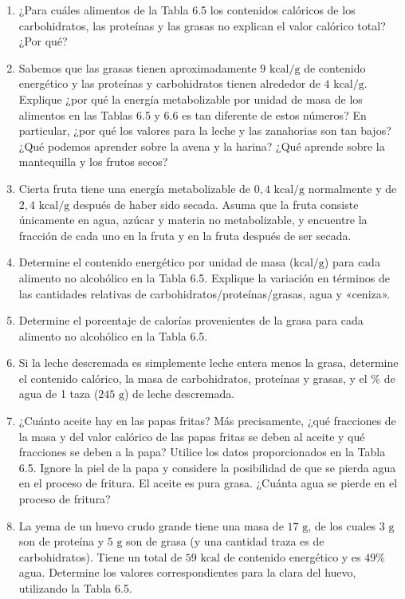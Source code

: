 \documentclass[12pt]{book}
\begin{document}
\begin{enumerate}
\item[6.17] ¿Para cuáles alimentos de la Tabla 6.5 los contenidos calóricos de los carbohidratos, las proteínas y las grasas no explican el valor calórico total? ¿Por qué?

\item[6.18] Sabemos que las grasas tienen aproximadamente $9\text{ kcal/g}$ de contenido energético y las proteínas y carbohidratos tienen alrededor de $4\text{ kcal/g}$. Explique ¿por qué la energía metabolizable por unidad de masa de los alimentos en las Tablas 6.5 y 6.6 es tan diferente de estos números? En particular, ¿por qué los valores para la leche y las zanahorias son tan bajos? ¿Qué podemos aprender sobre la avena y la harina? ¿Qué aprende sobre la mantequilla y los frutos secos?

\item[6.19] Cierta fruta tiene una energía metabolizable de $0{,}4\text{ kcal/g}$ normalmente y de $2{,}4\text{ kcal/g}$ después de haber sido secada. Asuma que la fruta consiste únicamente en agua, azúcar y materia no metabolizable, y encuentre la fracción de cada uno en la fruta y en la fruta después de ser secada.

\item[6.20] Determine el contenido energético por unidad de masa ($\text{kcal/g}$) para cada alimento no alcohólico en la Tabla 6.5. Explique la variación en términos de las cantidades relativas de carbohidratos/proteínas/grasas, agua y «ceniza».

\item[6.21] Determine el porcentaje de calorías provenientes de la grasa para cada alimento no alcohólico en la Tabla 6.5.

\item[6.22] Si la leche descremada es simplemente leche entera menos la grasa, determine el contenido calórico, la masa de carbohidratos, proteínas y grasas, y el $\%$ de agua de 1 taza ($245\text{ g}$) de leche descremada.

\item[6.23] ¿Cuánto aceite hay en las papas fritas? Más precisamente, ¿qué fracciones de la masa y del valor calórico de las papas fritas se deben al aceite y qué fracciones se deben a la papa? Utilice los datos proporcionados en la Tabla 6.5. Ignore la piel de la papa y considere la posibilidad de que se pierda agua en el proceso de fritura. El aceite es pura grasa. ¿Cuánta agua se pierde en el proceso de fritura?

\item[6.24] La yema de un huevo crudo grande tiene una masa de $17\text{ g}$, de los cuales $3\text{ g}$ son de proteína y $5\text{ g}$ son de grasa (y una cantidad traza es de carbohidratos). Tiene un total de $59\text{ kcal}$ de contenido energético y es $49\%$ agua. Determine los valores correspondientes para la clara del huevo, utilizando la Tabla 6.5.


\end{enumerate}
\end{document}
